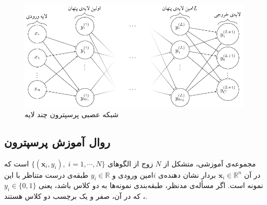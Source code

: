 \documentclass[11pt, twoside]{imsproc}
\begin{document}

\begin{figure}[t]
    \centering
        \centering
			\includegraphics[width=.8\linewidth]{images/MLP}
			\caption{شبکه عصبی پرسپترون چند لایه}
			\label{fig:MLP}
\end{figure}
\subsection{روال آموزش پرسپترون}\label{sec:learning}
مجموعه‌ی آموزشی، متشکل از
$N$
زوج از الگوهای
$\{ ({\mathbf{x}}_i,{y}_i),\;i=1,\cdots,N\}$
است که در آن
$\mathbf{x}_i\in \mathbb{R}^n$
بردار نشان دهنده‌ی $i$امین ورودی و
$y_i\in \mathbb{R}$
طبقه‌ی درست متناظر با این نمونه است.
 اگر مسأله‌ی مدنظر، طبقه‌بندی نمونه‌ها به دو کلاس باشد، يعنی 
$y_i\in\{0,1\}$،
که در آن، صفر و یک برچسب دو کلاس هستند. %
\end{document}
